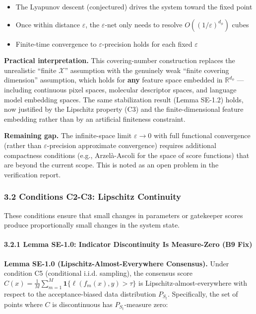 \documentclass[
  12pt,
]{article}
\providecommand{\tightlist}{%
  \setlength{\itemsep}{0pt}\setlength{\parskip}{0pt}}
\begin{document}
\begin{enumerate}
  \begin{itemize}
  \tightlist
  \item
    The Lyapunov descent (conjectured) drives the system toward the
    fixed point
  \item
    Once within distance \(\varepsilon\), the \(\varepsilon\)-net only
    needs to resolve \(O((1/\varepsilon)^{d_\phi})\) cubes
  \item
    Finite-time convergence to \(\varepsilon\)-precision holds for each
    fixed \(\varepsilon\)
  \end{itemize}
\end{enumerate}

\textbf{Practical interpretation.} This covering-number construction
replaces the unrealistic ``finite \(\mathcal{X}\)'' assumption with the
genuinely weak ``finite covering dimension'' assumption, which holds for
\textbf{any} feature space embedded in \(\mathbb{R}^{d_\phi}\) ---
including continuous pixel spaces, molecular descriptor spaces, and
language model embedding spaces. The same stabilization result (Lemma
SE-1.2) holds, now justified by the Lipschitz property (C3) and the
finite-dimensional feature embedding rather than by an artificial
finiteness constraint.

\textbf{Remaining gap.} The infinite-space limit \(\varepsilon \to 0\)
with full functional convergence (rather than \(\varepsilon\)-precision
approximate convergence) requires additional compactness conditions
(e.g., Arzelà-Ascoli for the space of score functions) that are beyond
the current scope. This is noted as an open problem in the verification
report.

\subsubsection{3.2 Conditions C2-C3: Lipschitz
Continuity}\label{conditions-c2-c3-lipschitz-continuity}

These conditions ensure that small changes in parameters or gatekeeper
scores produce proportionally small changes in the system state.

\paragraph{3.2.1 Lemma SE-1.0: Indicator Discontinuity Is Measure-Zero
(B9
Fix)}\label{lemma-se-1.0-indicator-discontinuity-is-measure-zero-b9-fix}

\textbf{Lemma SE-1.0 (Lipschitz-Almost-Everywhere Consensus).} Under
condition C5 (conditional i.i.d. sampling), the consensus score
\(C(x) = \frac{1}{M}\sum_{m=1}^M \mathbf{1}\{\ell(f_m(x), y) > \tau\}\)
is Lipschitz-almost-everywhere with respect to the acceptance-biased
data distribution \(P_{S_t}\). Specifically, the set of points where
\(C\) is discontinuous has \(P_{S_t}\)-measure zero:
\end{document}
